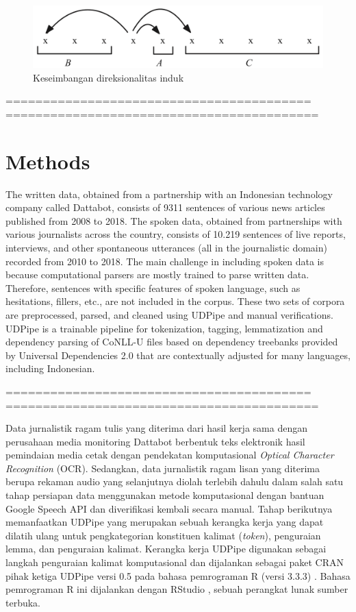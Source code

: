 \documentclass[10pt, a4paper, conference, compsocconf]{IEEEtran}
\begin{document}
\begin{figure}
	\centering \includegraphics[width=0.8
	\textwidth] {pics/balancedbranching.png} \caption{Keseimbangan direksionalitas induk} 
\label{fig:balancedbranching} \end{figure}
=========================================
==========================================

\section{Methods}

The written data, obtained from a partnership with an Indonesian technology company called Dattabot, consists of 9311 sentences of various news articles published from 2008 to 2018. The spoken data, obtained from partnerships with various journalists across the country, consists of 10.219 sentences of live reports, interviews, and other spontaneous utterances (all in the journalistic domain) recorded from 2010 to 2018. The main challenge in including spoken data is because computational parsers are mostly trained to parse written data. Therefore, sentences with specific features of spoken language, such as hesitations, fillers, etc., are not included in the corpus. These two sets of corpora are preprocessed, parsed, and cleaned using UDPipe \citep{udpipe2017} and manual verifications. UDPipe \citep{udpipe2017} is a trainable pipeline for tokenization, tagging, lemmatization and dependency parsing of CoNLL-U files based on dependency treebanks provided by Universal Dependencies 2.0 \citep{nivre2017universal} that are contextually adjusted for many languages, including Indonesian.

=========================================
==========================================

Data jurnalistik ragam tulis yang diterima dari hasil kerja sama dengan perusahaan media monitoring Dattabot berbentuk teks elektronik hasil pemindaian media cetak dengan pendekatan komputasional \textit{Optical Character Recognition} (OCR). Sedangkan, data jurnalistik ragam lisan yang diterima berupa rekaman audio yang selanjutnya diolah terlebih dahulu dalam salah satu tahap persiapan data menggunakan metode komputasional dengan bantuan Google Speech API dan diverifikasi kembali secara manual. Tahap berikutnya memanfaatkan UDPipe \citep{udpipe2017} yang merupakan sebuah kerangka kerja yang dapat dilatih ulang untuk pengkategorian konstituen kalimat (\textit{token}), penguraian lemma, dan penguraian kalimat. Kerangka kerja UDPipe digunakan sebagai langkah penguraian kalimat komputasional dan dijalankan sebagai paket CRAN pihak ketiga UDPipe versi 0.5 \citep{udpipe2017manual} pada bahasa pemrograman R (versi 3.3.3) \citep{r2017project}. Bahasa pemrograman R ini dijalankan dengan RStudio \citep{rstudio2017}, sebuah perangkat lunak sumber terbuka. 
\end{document}
